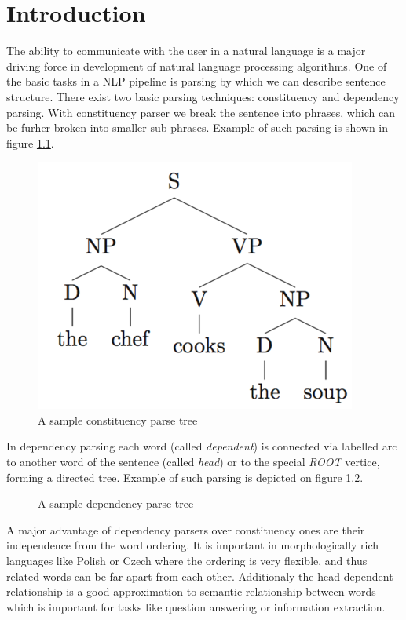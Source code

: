 \chapter{Introduction}
The ability to communicate with the user in a natural language is a major driving
force in development of natural language processing algorithms. One of the basic
tasks in a NLP pipeline is parsing by which we can describe sentence structure.
There exist two basic parsing techniques: constituency and dependency parsing.
With constituency parser we break the sentence into phrases, which can be furher
broken into smaller sub-phrases. Example of such parsing is shown in figure
\ref{fig:constituency_tree}.

\begin{figure}[!htbp]
  \centering
  \includegraphics[width=0.4\linewidth]{img/examples/dep/constituent.png}
  \caption{A sample constituency parse tree} 
  \label{fig:constituency_tree}
\end{figure}

In dependency parsing each word (called \emph{dependent})
is connected via labelled arc to another word of the sentence (called \emph{head})
or to the special \emph{ROOT} vertice, forming a directed tree.
Example of such parsing is depicted on figure \ref{fig:dependency_tree}.

\begin{figure}[!htbp]
  \centering
  \caption{A sample dependency parse tree} 
  \label{fig:dependency_tree}
\end{figure}

A major advantage of dependency parsers over constituency ones are their
independence from the word ordering. It is important in morphologically rich
languages like Polish or Czech where the ordering is very flexible, and thus
related words can be far apart from each other.
Additionaly the head-dependent relationship is a good approximation to semantic
relationship between words \cite{covington_fundamental_2001} which is important
for tasks like question answering or information extraction.

